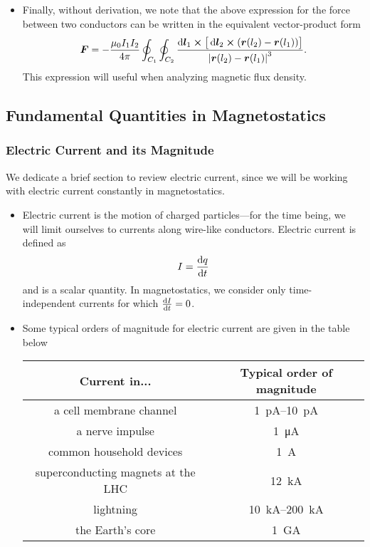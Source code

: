 \documentclass[11pt, a4paper]{article}
\newcommand{\diff}{\mathop{}\!\mathrm{d}} %
\renewcommand{\vec}[1]{\bm{#1}} %
\renewcommand{\r}{\vec{r}}
\newcommand{\mm}{\mu_{0}}  %
\begin{document}
\begin{itemize}
	\item Finally, without derivation, we note that the above expression for the force between two conductors can be written in the equivalent vector-product form
	\begin{equation*}
		\vec{F} = - \frac{\mm I_{1}I_{2}}{4\pi}\oint_{C_{1}}\oint_{C_{2}} \frac{\diff \vec{l}_{1}\cross \big[\diff \vec{l}_{2} \cross (\r(l_{2}) - \r(l_{1}) )\big]}{\abs{\r(l_{2}) - \r(l_{1})}^{3}}.
	\end{equation*}
    This expression will useful when analyzing magnetic flux density.
	
\end{itemize}


\subsection{Fundamental Quantities in Magnetostatics}

\subsubsection{Electric Current and its Magnitude}
We dedicate a brief section to review electric current, since we will be working with electric current constantly in magnetostatics. 
\begin{itemize}
	\item Electric current is the motion of charged particles---for the time being, we will limit ourselves to currents along wire-like conductors. Electric current is defined as
	\begin{equation*}
		I = \dv{q}{t}
	\end{equation*}
    and is a scalar quantity. In magnetostatics, we consider only time-independent currents for which $ \dv{I}{t} = 0 $.
	
	\item Some typical orders of magnitude for electric current are given in the table below
	
	\begin{center}
	\begin{tabular} {c|c}
        Current in... & Typical order of magnitude \\
        \hline
        a cell membrane channel &  \SIrange{1}{10}{\pico \ampere} \\
        a nerve impulse &  \SI{1}{\micro \ampere}  \\
        common household devices &  \SI{1}{\ampere} \\
        superconducting magnets at the LHC & \SI{12}{\kilo \ampere} \\
        lightning &  \SIrange{10}{200}{\kilo \ampere} \\
        the Earth's core &  \SI{1}{\giga \ampere} 
	\end{tabular}
	\end{center}
	
\end{itemize}
\end{document}

